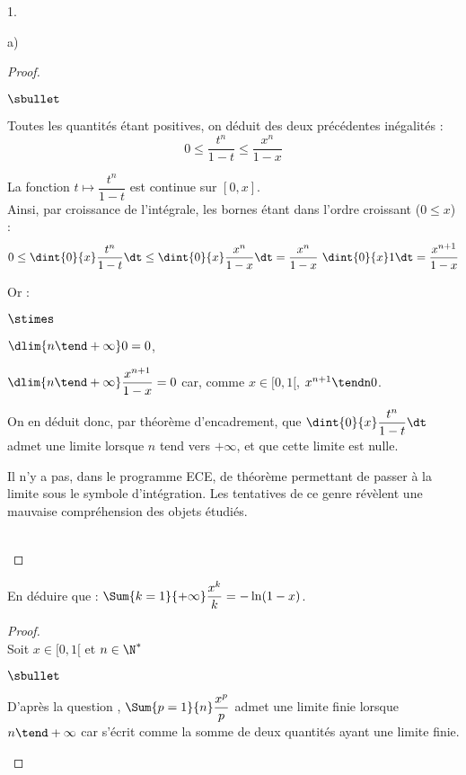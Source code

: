 \begin{noliste}{1.}
\begin{noliste}{a)}
\begin{proof}
\begin{noliste}{$\sbullet$}
      \item Toutes les quantités étant positives, on déduit des deux
        précédentes inégalités :
        \[
        0 \leq \dfrac{t^n}{1-t} \leq \dfrac{x^n}{1-x}
        \]

      \item La fonction $t \mapsto \dfrac{t^n}{1-t}$ est continue sur
        $[0, x]$.\\
        Ainsi, par croissance de l'intégrale, les bornes étant dans
        l'ordre croissant ($0 \leq x$) :
        \[
        0 \leq \dint{0}{x} \dfrac{t^n}{1-t} \dt \leq \dint{0}{x}
        \dfrac{x^n}{1-x} \dt = \dfrac{x^n}{1-x} \ \dint{0}{x} 1 \dt =
        \dfrac{x^{n+1}}{1-x}
        \]

      \item Or :
        \begin{noliste}{$\stimes$}
        \item $\dlim{n \tend +\infty} 0 = 0$,
        \item $\dlim{n \tend +\infty} \dfrac{x^{n+1}}{1-x} = 0$ car,
          comme $x \in [0, 1[$, $x^{n+1} \tendn 0$.
        \end{noliste}
        On en déduit donc, par théorème d'encadrement, que
        $\dint{0}{x} \dfrac{t^n}{1-t} \dt$ admet une limite lorsque
        $n$ tend vers $+\infty$, et que cette limite est nulle.
      \end{noliste}
      \conc{$\forall x \in [0,1[$, $\dlim{n \tend +\infty} \dint{0}{x}
        \dfrac{t^n}{1-t} \dt = 0$}%
      \begin{remark}%
        Il n'y a pas, dans le programme ECE, de théorème permettant de
        passer à la limite sous le symbole d'intégration. Les
        tentatives de ce genre révèlent une mauvaise compréhension des
        objets étudiés.
      \end{remark}~\\[-1.4cm]
    \end{proof}

  \item En déduire que : $\Sum{k = 1}{+ \infty}\dfrac{x^k}{k} =
    -\ln(1-x)$.

    \begin{proof}~\\
      Soit $x \in [0, 1[$ et $n \in \N^*$
      \begin{noliste}{$\sbullet$}
      \item D'après la question , $\Sum{p = 1}{n}
        \dfrac{x^{p}}{p}$ admet une limite finie lorsque $n \tend
        +\infty$ car s'écrit comme la somme de deux quantités ayant
        une limite finie.


\end{noliste}
\end{proof}
\end{noliste}
\end{noliste}
